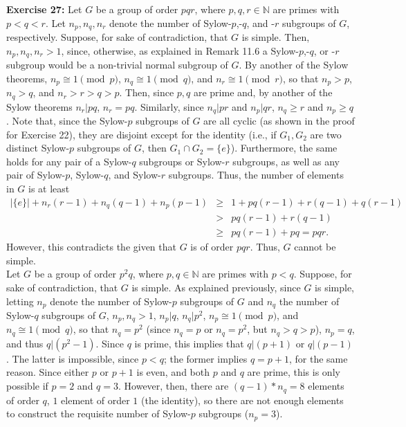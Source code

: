 \documentclass{article}%
\begin{document}
\textbf{Exercise 27:} Let $G$ be a group of order $pqr$, where $p,q,r \in
\mathbb{N}$ are primes with $p < q < r$. Let $n_p, n_q, n_r$ denote the number
of Sylow-$p$,-$q$, and -$r$ subgroups of $G$, respectively. Suppose, for sake
of contradiction, that $G$ is simple. Then, $n_p, n_q,n_r > 1$, since,
otherwise, as explained in Remark 11.6 a Sylow-$p$,-$q$, or -$r$ subgroup
would be a non-trivial normal subgroup of $G$. By another of the Sylow
theorems, $n_p \cong 1 \pmod p$, $n_q \cong 1 \pmod q$, and $n_r \cong 1 \pmod
r$, so that $n_p > p$, $n_ q > q$, and $n_r > r > q > p$. Then, since $p,q$
are prime and, by another of the Sylow theorems $n_r | pq$, $n_r = pq$.
Similarly, since $n_q | pr$ and $n_p | qr$, $n_q \geq r$ and $n_p \geq q$.
Note that, since the Sylow-$p$ subgroups of $G$ are all cyclic (as shown in
the proof for Exercise 22), they are disjoint except for the identity (i.e., if
$G_1,G_2$ are two distinct Sylow-$p$ subgroups of $G$, then $G_1 \cap G_2 =
\{e\}$). Furthermore, the same holds for any pair of a Sylow-$q$ subgroups or
Sylow-$r$ subgroups, as well as any pair of Sylow-$p$, Sylow-$q$, and
Sylow-$r$ subgroups. Thus, the number of elements in $G$ is at least
\begin{eqnarray*}
|\{e\}| + n_r(r - 1) + n_q(q - 1) + n_p(p - 1) 
& \geq & 1 + pq(r - 1) + r(q - 1) + q(r - 1) \\
& >    & pq(r - 1) + r(q - 1) \\
& \geq & pq(r - 1) + pq = pqr.
\end{eqnarray*}
However, this contradicts the given that $G$ is of order $pqr$. Thus, $G$ cannot
be simple. \\

Let $G$ be a group of order $p^2q$, where $p, q \in \mathbb{N}$ are primes with
$p < q$. Suppose, for sake of contradiction, that $G$ is simple. As explained
previously, since $G$ is simple, letting $n_p$ denote the number of Sylow-$p$
subgroups of $G$ and $n_q$ the number of Sylow-$q$ subgroups of $G$, $n_p, n_q
 > 1$, $n_p | q$, $n_q | p^2$, $n_p \cong 1 \pmod p$, and $n_q \cong 1 \pmod
q$, so that $n_q = p^2$ (since $n_q = p$ or $n_q = p^2$, but $n_q > q > p$),
$n_p = q$, and thus $q | (p^2 - 1)$. Since $q$ is prime, this implies that
$q | (p + 1)$ or $q | (p - 1)$. The latter is impossible, since $p < q$; the
former implies $q = p + 1$, for the same reason. Since either $p$ or $p + 1$
is even, and both $p$ and $q$ are prime, this is only possible if $p = 2$ and 
$q = 3$. However, then, there are $(q - 1)*n_q = 8$ elements of order $q$,
$1$ element of order $1$ (the identity), so there are not enough elements
to construct the requisite number of Sylow-$p$ subgroups ($n_p = 3$). \\
\end{document}
